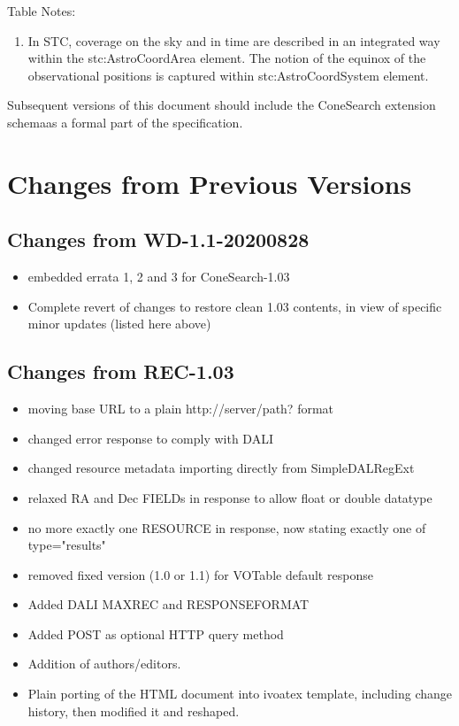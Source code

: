 \documentclass[11pt,a4paper]{ivoa}
\begin{document}
Table Notes:
\begin{enumerate}
	\item In STC, coverage on the sky and in
		time are described in an integrated way within the stc:AstroCoordArea
		element. The notion of the equinox of the observational positions is
		captured within stc:AstroCoordSystem element.
\end{enumerate} 

Subsequent versions of this document should include the ConeSearch extension 
schemaas a formal part of the specification.

\section{Changes from Previous Versions}

\subsection*{Changes from WD-1.1-20200828}
\begin{itemize}
% 
%
%
%
%
	\item embedded errata 1, 2 and 3 for ConeSearch-1.03
	\item Complete revert of changes to restore clean 1.03 contents,
		in view of specific minor updates (listed here above)
\end{itemize}

\subsection*{Changes from REC-1.03}
\label{appendix:first11changes}
\begin{itemize}
	\item moving base URL to a plain http://server/path? format
	\item changed error response to comply with DALI
	\item changed resource metadata importing directly from SimpleDALRegExt
	\item relaxed RA and Dec FIELDs in response to allow float or double datatype
	\item no more exactly one RESOURCE in response, now stating exactly one of
		type="results"
	\item removed fixed version (1.0 or 1.1) for VOTable default response
	\item Added DALI MAXREC and RESPONSEFORMAT
	\item Added POST as optional HTTP query method
	\item Addition of authors/editors.
	\item Plain porting of the HTML document into ivoatex template,
		including change history, then modified it and reshaped.
\end{itemize}
\end{document}
